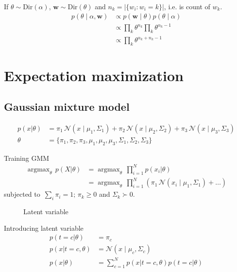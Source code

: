 \documentclass{book}
\DeclareMathOperator*{\argmax}{argmax}
\begin{document}
If $\theta \sim \text{Dir}(\alpha)$, $\mathbf{w} \sim \text{Dir}(\theta)$ and $n_k = \lvert{\{w_i: w_i =k \}}\rvert$, i.e. is count of $w_k$. 
\begin{align*}
p(\theta \mid \alpha, \mathbf{w}) &\propto p(\mathbf{w} \mid \theta) p(\theta \mid \alpha) \\
&\propto \prod_{k} {\theta}^{n_k} \prod_{k} {\theta}^{\alpha_k -1} \\
&\propto \prod_{k} {\theta}^{\alpha_k + n_k -1}
\end{align*}

\section{Expectation maximization}

\subsection{Gaussian mixture model}
\begin{align*}
p(x | \theta) &= \pi_1 \, \mathcal{N}(x\mid \mu_1 ,\Sigma_1) + \pi_2 \, \mathcal{N}(x\mid \mu_2 ,\Sigma_2) + \pi_3 \, \mathcal{N}(x\mid \mu_3 ,\Sigma_3) \\
\theta &= \{ \pi_1, \pi_2, \pi_3, \mu_1, \mu_2, \mu_3, \Sigma_1, \Sigma_2, \Sigma_3 \}
\end{align*}

Training GMM
\begin{align*}
\argmax_{\theta} \, p(X | \theta) &= \argmax_{\theta} \, \prod_{i=1}^{N}  p(x_i | \theta) \\
&= \argmax_{\theta} \, \prod_{i=1}^{N} ( \pi_1 \, \mathcal{N}(x_i\mid \mu_1 ,\Sigma_1) + \dots )
\end{align*}
subjected to $\, \sum_i \pi_i = 1; \, \pi_k \geq 0$ and $\Sigma_k \succ 0$.

\begin{figure}[h]
\centering
\caption{Latent variable}
\end{figure}

Introducing latent variable
\begin{align*}
p(t=c | \theta) &= \pi_c \\
p(x | t=c, \theta) &= \mathcal{N}(x\mid \mu_c ,\Sigma_c) \\
p(x | \theta) &= \sum_{c=1}^{N} p(x | t=c, \theta)p(t=c | \theta) 
\end{align*}
\end{document}
